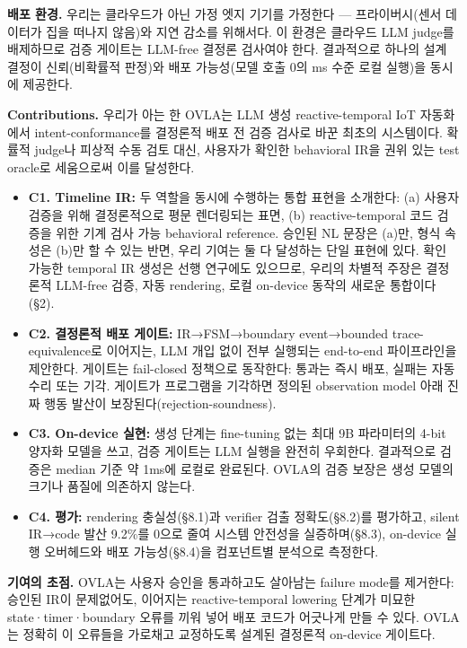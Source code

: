 \documentclass[sigconf,nonacm,anonymous,review]{acmart}
\begin{document}
\textbf{배포 환경.} 우리는 클라우드가 아닌 가정 엣지 기기를 가정한다 — 프라이버시(센서 데이터가 집을 떠나지 않음)와 지연 감소를 위해서다.
이 환경은 클라우드 LLM judge를 배제하므로 검증 게이트는 LLM-free 결정론 검사여야 한다. 결과적으로 하나의 설계 결정이 신뢰(비확률적 판정)와 배포 가능성(모델 호출 0의 ms 수준 로컬 실행)을 동시에 제공한다.

\medskip\noindent\textbf{Contributions.}
우리가 아는 한 OVLA는 LLM 생성 reactive-temporal IoT 자동화에서 intent-conformance를 결정론적 배포 전 검증 검사로 바꾼 최초의 시스템이다. 확률적 judge나 피상적 수동 검토 대신, 사용자가 확인한 behavioral IR을 권위 있는 test oracle로 세움으로써 이를 달성한다.
\begin{itemize}
\item \textbf{C1. Timeline IR:} 두 역할을 동시에 수행하는 통합 표현을 소개한다: (a) 사용자 검증을 위해 결정론적으로 평문 렌더링되는 표면, (b) reactive-temporal 코드 검증을 위한 기계 검사 가능 behavioral reference. 승인된 NL 문장은 (a)만, 형식 속성은 (b)만 할 수 있는 반면, 우리 기여는 둘 다 달성하는 단일 표현에 있다. 확인 가능한 temporal IR 생성은 선행 연구에도 있으므로, 우리의 차별적 주장은 결정론적 LLM-free 검증, 자동 rendering, 로컬 on-device 동작의 새로운 통합이다(\S2).
\item \textbf{C2. 결정론적 배포 게이트:} IR→FSM→boundary event→bounded trace-equivalence로 이어지는, LLM 개입 없이 전부 실행되는 end-to-end 파이프라인을 제안한다. 게이트는 fail-closed 정책으로 동작한다: 통과는 즉시 배포, 실패는 자동 수리 또는 기각. 게이트가 프로그램을 기각하면 정의된 observation model 아래 진짜 행동 발산이 보장된다(rejection-soundness).
\item \textbf{C3. On-device 실현:} 생성 단계는 fine-tuning 없는 최대 9B 파라미터의 4-bit 양자화 모델을 쓰고, 검증 게이트는 LLM 실행을 완전히 우회한다. 결과적으로 검증은 median 기준 약 1ms에 로컬로 완료된다. OVLA의 검증 보장은 생성 모델의 크기나 품질에 의존하지 않는다.
\item \textbf{C4. 평가:} rendering 충실성(\S8.1)과 verifier 검출 정확도(\S8.2)를 평가하고, silent IR→code 발산 9.2\%를 0으로 줄여 시스템 안전성을 실증하며(\S8.3), on-device 실행 오버헤드와 배포 가능성(\S8.4)을 컴포넌트별 분석으로 측정한다.
\end{itemize}

\textbf{기여의 초점.} OVLA는 사용자 승인을 통과하고도 살아남는 failure mode를 제거한다: 승인된 IR이 문제없어도, 이어지는 reactive-temporal lowering 단계가 미묘한 state·timer·boundary 오류를 끼워 넣어 배포 코드가 어긋나게 만들 수 있다. OVLA는 정확히 이 오류들을 가로채고 교정하도록 설계된 결정론적 on-device 게이트다.
\end{document}
